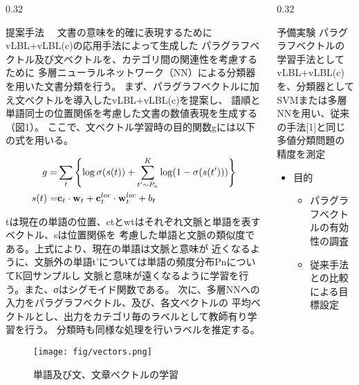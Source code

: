 \documentclass[10pt,unicode]{beamer}
\newcommand{\columnsize}{0.32}
\begin{document}
\begin{frame}{}
\begin{columns}[t]
\begin{column}{\columnsize\textwidth} %
  \begin{block}{提案手法}
    　文書の意味を的確に表現するためにvLBL+vLBL(c)の応用手法によって生成した
    パラグラフベクトル及び文ベクトルを、カテゴリ間の関連性を考慮するために
    多層ニューラルネットワーク（NN）による分類器を用いた文書分類を行う。
    まず、パラグラフベクトルに加え文ベクトルを導入したvLBL+vLBL(c)を提案し、
    語順と単語同士の位置関係を考慮した文書の数値表現を生成する（図1）。
    ここで、文ベクトル学習時の目的関数gには以下の式を用いる。

    \begin{eqnarray*}
      g = & \sum_t \left\{ \log\sigma(s(t))
          + \sum^K_{t' \sim P_n} \log(1 - \sigma(s(t'))) \right\} \\
      s(t) = & {\bf c}_t \cdot {\bf w}_t
             + {\bf c}^{loc}_t \cdot {\bf w}^{loc}_t + b_t
    \end{eqnarray*}

    tは現在の単語の位置、ctとwtはそれぞれ文脈と単語を表すベクトル、sは位置関係を
    考慮した単語と文脈の類似度である。上式により、現在の単語は文脈と意味が
    近くなるように、文脈外の単語t'については単語の頻度分布PnについてK回サンプルし
    文脈と意味が遠くなるように学習を行う。また、σはシグモイド関数である。
    次に、多層NNへの入力をパラグラフベクトル、及び、各文ベクトルの
    平均ベクトルとし、出力をカテゴリ毎のラベルとして教師有り学習を行う。
    分類時も同様な処理を行いラベルを推定する。

    \begin{figure}
      \texttt{[image: fig/vectors.png]}
      \caption{単語及び文、文章ベクトルの学習}
    \end{figure}
  \end{block}
\end{column} %

\begin{column}{\columnsize\textwidth} %
  \begin{block}{予備実験}
    パラグラフベクトルの学習手法としてvLBL+vLBL(c)を、分類器として
    SVMまたは多層NNを用い、従来の手法[1]と同じ多値分類問題の精度を測定

    \begin{itemize}
      \item 目的 \\
      \begin{itemize}
        \item パラグラフベクトルの有効性の調査
        \item 従来手法との比較による目標設定
      \end{itemize}


\end{itemize}
\end{block}
\end{column}
\end{columns}
\end{frame}
\end{document}
